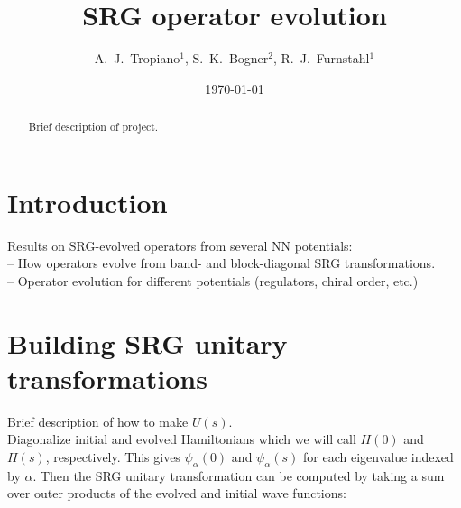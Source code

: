 \documentclass[preprintnumbers,floatfix,aps,prc,preprint,nofootinbib]{revtex4-1}
\begin{document}
\title{SRG operator evolution}


\author{A.~J.~Tropiano$^{1}$, S.~K.~Bogner$^{2}$, R.~J.~Furnstahl$^{1}$}


\date{\today}

\begin{abstract}

Brief description of project.

\end{abstract}


\maketitle

\newpage


\section{Introduction}
\label{sec:intro}


Results on SRG-evolved operators from several NN potentials:
\\
-- How operators evolve from band- and block-diagonal SRG transformations.
\\
-- Operator evolution for different potentials (regulators, chiral order, etc.)


\section{Building SRG unitary transformations}
\label{sec:srg_unitary_transformations}


Brief description of how to make $U(s)$.
\\

Diagonalize initial and evolved Hamiltonians which we will call $H(0)$ and $H(s)$, respectively. This gives $\psi_{\alpha}(0)$ and $\psi_{\alpha}(s)$ for each eigenvalue indexed by $\alpha$. Then the SRG unitary transformation can be computed by taking a sum over outer products of the evolved and initial wave functions:
\end{document}
